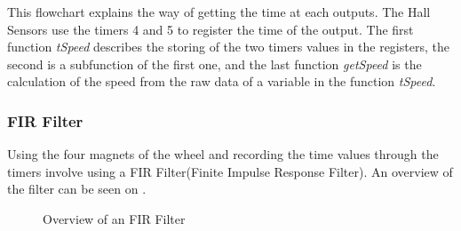This flowchart explains the way of getting the time at each outputs. The Hall Sensors use the timers 4 and 5 to register the time of the output. The first function \textit{tSpeed} describes the storing of the two timers values in the registers, the second is a subfunction of the first one, and the last function \textit{getSpeed} is the calculation of the speed from the raw data of a variable in the function \textit{tSpeed}.\\

\subsubsection{FIR Filter}

Using the four magnets of the wheel and recording the time values through the timers involve using a  FIR Filter(Finite Impulse Response Filter). An overview of the filter can be seen on .


\begin{figure}[H]
	\centering
	\caption{Overview of an FIR Filter}
	\label{FIRFilter}
\end{figure}
